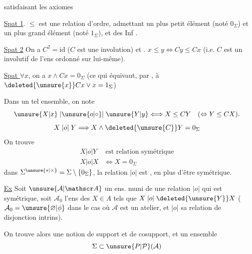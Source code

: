 satisfaisant les axiomes

\uline{Spat 1}. $\leq$ est une relation d'ordre, admettant un plus petit élément (noté $0_{\Sigma}$) et un plus grand élément (noté $1_{\Sigma}$), et \unsure{$=$|\textquotedbl} des Inf .

\uline{Spat 2} On  a $C^2=\mathrm{id}$ ($C$ est une involution) et  . $x\leq y\Longleftrightarrow Cy\leq Cx$ (i.e. $C$ est un  involutif de l'ens ordonné sur lui-même).

\uline{Spat } $\forall x$, on a $x\wedge Cx=0_{\Sigma}$ (ce qui équivaut, par , à $\deleted{\unsure{x}}Cx\vee x=1_{\Sigma}$)

Dans un tel ensemble, on note
\[
\unsure{X|x}\mathrel{|\unsure{o|\circ}|}\unsure{Y|y}\Longleftrightarrow X\leq CY\quad(\Leftrightarrow Y\leq CX).
\]
\[
X\mathrel{|o|}Y\Longrightarrow X\wedge\deleted{\unsure{C}}Y=0_{\Sigma}
\]
On trouve
\[
\begin{aligned}
X\mathrel{|o|}Y &\ \text{est relation symétrique}\\
X\mathrel{|o|}X &\Longleftrightarrow X=0_{\Sigma}
\end{aligned}
\]
 dans $\Sigma^{\unsure{*|\times}}=\Sigma\setminus\{0_{\Sigma}\}$, la relation $\mathrel{|o|}$ est , en plus d'être symétrique.

\uline{Ex} Soit $\unsure{\mathcal A|\mathscr A}$ un ens. muni de une relation $\mathrel{|o|}$ qui est symétrique, soit $\mathcal A_0$ l'ens des $X\in A$ tels que $X\mathrel{|o|}\deleted{\unsure{Y}}X$     ($\mathcal A_0=\unsure{\varnothing|\phi}$ dans le cas où $\mathcal A$ est un atelier, et $\mathrel{|o|}$ sa  relation de disjonction intrins).


On trouve alors une notion de support et de cosupport, et un ensemble 
\[
\Sigma\subset\unsure{P|\mathcal P}(\mathcal A)
\]
